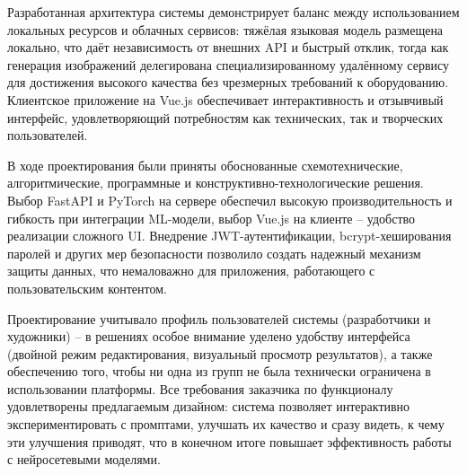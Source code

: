 Разработанная архитектура системы демонстрирует баланс между использованием локальных ресурсов и облачных сервисов: тяжёлая языковая модель размещена локально, что даёт независимость от внешних API и быстрый отклик, тогда как генерация изображений делегирована специализированному удалённому сервису для достижения высокого качества без чрезмерных требований к оборудованию. Клиентское приложение на Vue.js обеспечивает интерактивность и отзывчивый интерфейс, удовлетворяющий потребностям как технических, так и творческих пользователей.

В ходе проектирования были приняты обоснованные схемотехнические, алгоритмические, программные и конструктивно-технологические решения. Выбор FastAPI и PyTorch на сервере обеспечил высокую производительность и гибкость при интеграции ML-модели, выбор Vue.js на клиенте – удобство реализации сложного UI. Внедрение JWT-аутентификации, bcrypt-хеширования паролей и других мер безопасности позволило создать надежный механизм защиты данных, что немаловажно для приложения, работающего с пользовательским контентом.

Проектирование учитывало профиль пользователей системы (разработчики и художники) – в решениях особое внимание уделено удобству интерфейса (двойной режим редактирования, визуальный просмотр результатов), а также обеспечению того, чтобы ни одна из групп не была технически ограничена в использовании платформы. Все требования заказчика по функционалу удовлетворены предлагаемым дизайном: система позволяет интерактивно экспериментировать с промптами, улучшать их качество и сразу видеть, к чему эти улучшения приводят, что в конечном итоге повышает эффективность работы с нейросетевыми моделями.
